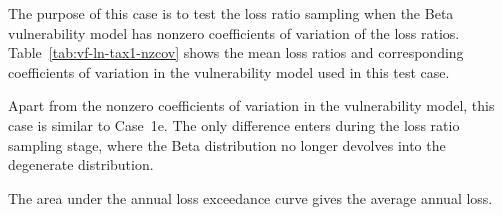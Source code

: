 The purpose of this case is to test the loss ratio sampling when the Beta vulnerability model has nonzero coefficients of variation of the loss ratios. Table~\ref{tab:vf-ln-tax1-nzcov} shows the mean loss ratios and corresponding coefficients of variation in the vulnerability model used in this test case.

Apart from the nonzero coefficients of variation in the vulnerability model, this case is similar to Case~1e. The only difference enters during the loss ratio sampling stage, where the Beta distribution no longer devolves into the degenerate distribution.



The area under the annual loss exceedance curve gives the average annual loss.
